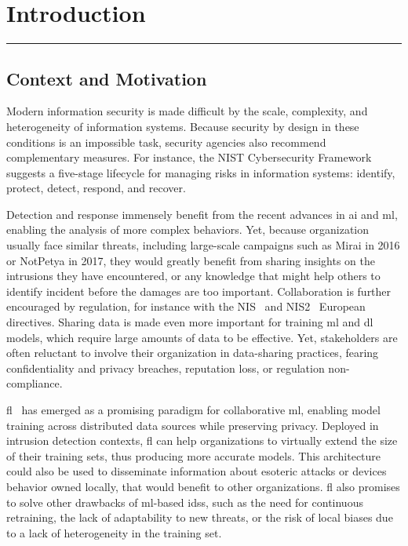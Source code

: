 \chapter{Introduction\label{chap:intro}}

\vspace{-9ex}
\localtableofcontents
\par\noindent\rule{\textwidth}{0.4pt}

\section{Context and Motivation\label{sec:intro.context}}

Modern information security is made difficult by the scale, complexity, and heterogeneity of information systems.
Because security by design in these conditions is an impossible task, security agencies also recommend complementary measures.
For instance, the NIST Cybersecurity Framework~\cite{nationalinstituteofstandardsandtechnology_NISTCybersecurityFramework_2024} suggests a five-stage lifecycle for managing risks in information systems: identify, protect, detect, respond, and recover.

Detection and response immensely benefit from the recent advances in \gls{ai} and \gls{ml}, enabling the analysis of more complex behaviors.
Yet, because organization usually face similar threats, including large-scale campaigns such as Mirai in 2016 or NotPetya in 2017, they would greatly benefit from sharing insights on the intrusions they have encountered, or any knowledge that might help others to identify incident before the damages are too important.
Collaboration is further encouraged by regulation, for instance with the NIS~\cite{NIS2016} and NIS2~\cite{NIS2} European directives.
Sharing data is made even more important for training \gls{ml} and \gls{dl} models, which require large amounts of data to be effective.
Yet, stakeholders are often reluctant to involve their organization in data-sharing practices, fearing confidentiality and privacy breaches, reputation loss, or regulation non-compliance.

\Gls{fl}~\cite{mcmahan_Communicationefficientlearningdeep_2017} has emerged as a promising paradigm for collaborative \gls{ml}, enabling model training across distributed data sources while preserving privacy.
Deployed in intrusion detection contexts, \gls{fl} can help organizations to virtually extend the size of their training sets, thus producing more accurate models.
This architecture could also be used to disseminate information about esoteric attacks or devices behavior owned locally, that would benefit to other organizations.
\Gls{fl} also promises to solve other drawbacks of \gls{ml}-based \glspl{ids}, such as the need for continuous retraining\needref, the lack of adaptability to new threats\needref, or the risk of local biases due to a lack of heterogeneity in the training set\needref.

